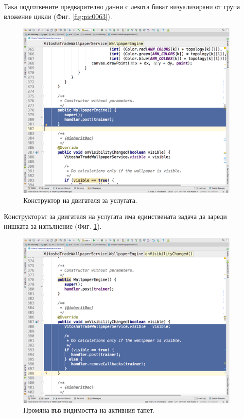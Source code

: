 \documentclass[book,14pt,oneside,openany]{memoir}
\begin{document}
Така подготвените предварително данни с лекота биват визуализирани от група вложение цикли (Фиг. \ref{fig:pic0063}).

\begin{figure}[h]
  \centering
  \includegraphics[height=0.45\pdfpageheight]{./images/pic0064.png}
  \caption{Конструктор на двигателя за услугата.}
\label{fig:pic0064}
\end{figure}
\FloatBarrier

Конструкторът за двигателя на услугата има единствената задача да зареди нишката за изпълнение (Фиг. \ref{fig:pic0064}).

\begin{figure}[h]
  \centering
  \includegraphics[height=0.45\pdfpageheight]{./images/pic0065.png}
  \caption{Промяна във видимостта на активния тапет.}
\label{fig:pic0065}
\end{figure}
\FloatBarrier
\end{document}
